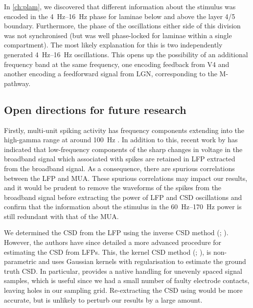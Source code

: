 In \autoref{ch:plam}, we discovered that different information about the stimulus was encoded in the \SIrange{4}{16}{Hz} phase for laminae below and above the layer 4/5 boundary.
Furthermore, the phase of the oscillations either side of this division was not synchronised (but was well phase-locked for laminae within a single compartment).
The most likely explanation for this is two independently generated \SIrange{4}{16}{Hz} oscillations.
This opens up the possibility of an additional frequency band at the same frequency, one encoding feedback from \ac{V4} and another encoding a feedforward signal from \ac{LGN}, corresponding to the M-pathway.


\subsection{Open directions for future research}

Firstly, multi-unit spiking activity has frequency components extending into the high-gamma range at around \SI{100}{Hz} \citep{Einevoll2013}.
In addition to this, recent work by \citet{Zanos2011} has indicated that low-frequency components of the sharp changes in voltage in the broadband signal which associated with spikes are retained in \ac{LFP} extracted from the broadband signal.
As a consequence, there are spurious correlations between the \ac{LFP} and \ac{MUA}.
These spurious correlations may impact our results, and it would be prudent to remove the waveforms of the spikes from the broadband signal before extracting the power of \ac{LFP} and \ac{CSD} oscillations \citep{Zanos2011} and confirm that the information about the stimulus in the \SIrange{60}{170}{Hz} power is still redundant with that of the \ac{MUA}.

We determined the \ac{CSD} from the \ac{LFP} using the inverse \ac{CSD} method (; \citealp{Pettersen2006}).
However, the authors have since detailed a more advanced procedure for estimating the \ac{CSD} from \acp{LFP}.
This, the kernel \acl{CSD} method (; \citealp{Potworowski2012}), is non-parametric and uses Gaussian kernels with regularisation to estimate the ground truth \ac{CSD}.
In particular,  provides a native handling for unevenly spaced signal samples, which is useful since we had a small number of faulty electrode contacts, leaving holes in our sampling grid.
Re-extracting the \ac{CSD} using  would be more accurate, but is unlikely to perturb our results by a large amount.

